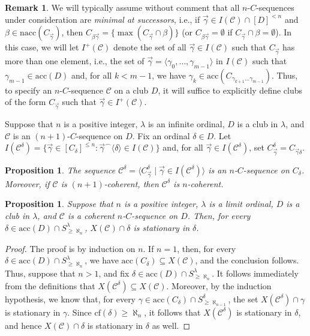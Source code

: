 \documentclass{amsart}
\numberwithin{theorem}{section}
\newtheorem{proposition}[theorem]{Proposition}
\theoremstyle{definition}
\newtheorem{remark}[theorem]{Remark}
\newcommand{\cf}{\mathrm{cf}}
\newcommand{\nacc}{\mathrm{nacc}}
\newcommand{\acc}{\mathrm{acc}}
\newcommand{\mc}{\mathcal}
\begin{document}
\begin{remark} \label{remark: minimal_at_successors}
  We will typically assume without comment that all $n$-$C$-sequences under consideration 
  are \emph{minimal at successors}, i.e., if $\vec{\gamma} \in I(\mc{C}) \cap [D]^{<n}$ and 
  $\beta \in \nacc(C_{\vec{\gamma}})$, then $C_{\beta\vec{\gamma}} = \{\max(C_{\vec{\gamma}} 
  \cap \beta)\}$ (or $C_{\beta\vec{\gamma}} = \emptyset$ if $C_{\vec{\gamma}} \cap 
  \beta = \emptyset$). In this case, we will let $I^+(\mc{C})$ denote the set of all 
  $\vec{\gamma} \in I(\mc{C})$ such that $C_{\vec{\gamma}}$ has more than one element, i.e., 
  the set of $\vec{\gamma} = \langle \gamma_0, \ldots, \gamma_{m-1} \rangle$ in 
  $I(\mc{C})$ such that $\gamma_{m-1} \in \acc(D)$ and, for all $k < m-1$, we have 
  $\gamma_k \in \acc(C_{\gamma_{k+1}\ldots\gamma_{m-1}})$.
  Thus, to specify an $n$-$C$-sequence $\mc{C}$ on a club $D$, it will 
  suffice to explicitly define clubs of the form $C_{\vec{\gamma}}$ such that 
  $\vec{\gamma} \in I^+(\mc{C})$.
\end{remark}

Suppose that $n$ is a positive integer, $\lambda$ is an infinite ordinal, 
$D$ is a club in $\lambda$, and $\mc{C}$ is an $(n+1)$-$C$-sequence on 
$D$. Fix an ordinal $\delta \in D$. Let $I(\mc{C}^\delta) = 
\{\vec{\gamma} \in [C_\delta]^{\leq n} : \vec{\gamma}^\frown \langle 
\delta \rangle \in I(\mc{C})\}$ and, for all $\vec{\gamma} \in 
I(\mc{C}^\delta)$, set $C^\delta_{\vec{\gamma}} = C_{\vec{\gamma}\delta}$. 

\begin{proposition}
  The sequence $\mc{C}^\delta = \langle C^\delta_{\vec{\gamma}} \mid 
  \vec{\gamma} \in I(\mc{C}^\delta) \rangle$ is an $n$-$C$-sequence on 
  $C_\delta$. Moreover, if $\mc{C}$ is $(n+1)$-coherent, then $\mc{C}^\delta$ is 
  $n$-coherent.
\end{proposition}

\begin{proposition} \label{prop: stat_x}
  Suppose that $n$ is a positive integer, $\lambda$ is a limit ordinal, $D$ is 
  a club in $\lambda$, and $\mc{C}$ is a coherent $n$-$C$-sequence on $D$. 
  Then, for every $\delta \in \acc(D) \cap S^{\lambda}_{\geq \aleph_n}$, 
  $X(\mc{C}) \cap \delta$ is stationary in $\delta$.
\end{proposition}

\begin{proof}
  The proof is by induction on $n$. If $n = 1$, then, for every 
  $\delta \in \acc(D) \cap S^{\lambda}_{\geq \aleph_n}$, we have 
  $\acc(C_\delta) \subseteq X(\mc{C})$, and the conclusion follows. 
  Thus, suppose that $n > 1$, and fix $\delta \in \acc(D) \cap 
  S^{\lambda}_{\geq \aleph_n}$. It follows immediately from the definitions 
  that $X(\mc{C}^\delta) \subseteq X(\mc{C})$. Moreover, by the induction 
  hypothesis, we know that, for every $\gamma \in \acc(C_\delta) \cap 
  S^\delta_{{\geq} \aleph_{n-1}}$, the set $X(\mc{C}^\delta) \cap \gamma$ is 
  stationary in $\gamma$. Since $\cf(\delta) \geq \aleph_n$, it follows that 
  $X(\mc{C}^\delta)$ is stationary in $\delta$, and hence 
  $X(\mc{C}) \cap \delta$ is stationary in $\delta$ as well.
\end{proof}
\end{document}
